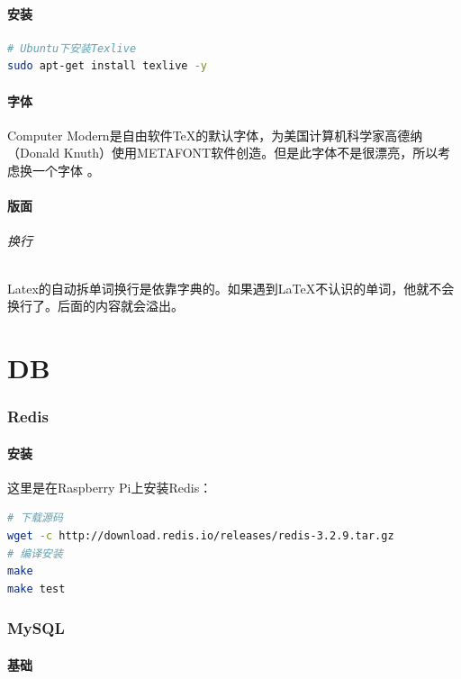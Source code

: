 \documentclass[letter]{book}
\begin{document}
\subsection{安装}

\begin{lstlisting}[language=Bash]
# Ubuntu下安装Texlive
sudo apt-get install texlive -y
\end{lstlisting}

\subsection{字体}

Computer Modern是自由软件TeX的默认字体，为美国计算机科学家高德纳（Donald Knuth）使用METAFONT软件创造。但是此字体不是很漂亮，所以考虑换一个字体 。

\subsection{版面}

\paragraph{换行}Latex的自动拆单词换行是依靠字典的。如果遇到\LaTeX{}不认识的单词，他就不会换行了。后面的内容就会溢出。

\part{DB}

\section{Redis}

\subsection{安装}

这里是在Raspberry Pi上安装Redis：

\begin{lstlisting}[language=Bash]
# 下载源码
wget -c http://download.redis.io/releases/redis-3.2.9.tar.gz
# 编译安装
make
make test
\end{lstlisting}


\section{MySQL}

\subsection{基础}
\end{document}
